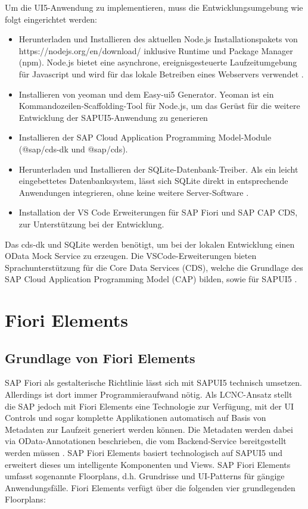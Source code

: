 Um die UI5-Anwendung zu implementieren, muss die Entwicklungsumgebung wie folgt eingerichtet werden:
\begin{itemize}[noitemsep]
\item Herunterladen und Installieren des aktuellen Node.js Installationspakets von https://nodejs.org/en/download/ inklusive Runtime und Package Manager (npm). Node.js bietet eine asynchrone, ereignisgesteuerte Laufzeitumgebung für Javascript und wird für das lokale Betreiben eines Webservers verwendet \cite{wiki:nodejs}.
\item Installieren von yeoman und dem Easy-ui5 Generator. Yeoman ist ein Kommandozeilen-Scaffolding-Tool für Node.js, um das Gerüst für die weitere Entwicklung der SAPUI5-Anwendung zu generieren 
\item Installieren der SAP Cloud Application Programming Model-Module (@sap/cds-dk und @sap/cds). 
\item Herunterladen und Installieren der SQLite-Datenbank-Treiber. Als ein leicht eingebettetes Datenbanksystem, lässt sich SQLite direkt in entsprechende Anwendungen integrieren, ohne keine weitere Server-Software \cite{wiki:sqlite}.
\item Installation der VS Code Erweiterungen für SAP Fiori und SAP CAP CDS, zur Unterstützung bei der Entwicklung.
\end{itemize}

Das cds-dk und SQLite werden benötigt, um bei der lokalen Entwicklung einen OData Mock Service zu erzeugen. Die VSCode-Erweiterungen bieten Sprachunterstützung für die Core Data Services (CDS), welche die Grundlage des SAP Cloud Application Programming Model (CAP) bilden, sowie für SAPUI5 \cite{vsc:cdsext}.

\section{Fiori Elements}
\subsection{Grundlage von Fiori Elements}
SAP Fiori als gestalterische Richtlinie lässt sich mit SAPUI5 technisch umsetzen. Allerdings ist dort immer Programmieraufwand nötig. Als LCNC-Ansatz stellt die SAP jedoch mit Fiori Elements eine Technologie zur Verfügung, mit der UI Controls und sogar komplette Applikationen automatisch auf Basis von Metadaten zur Laufzeit generiert werden können. Die Metadaten werden dabei via OData-Annotationen beschrieben, die vom Backend-Service bereitgestellt werden müssen \cite[S.48]{fiori}. SAP Fiori Elements basiert technologisch auf SAPUI5 und erweitert dieses um intelligente Komponenten und Views. SAP Fiori Elements umfasst sogenannte Floorplans, d.h. Grundrisse und UI-Patterns für gängige Anwendungsfälle. Fiori Elements verfügt über die folgenden vier grundlegenden Floorplans:

